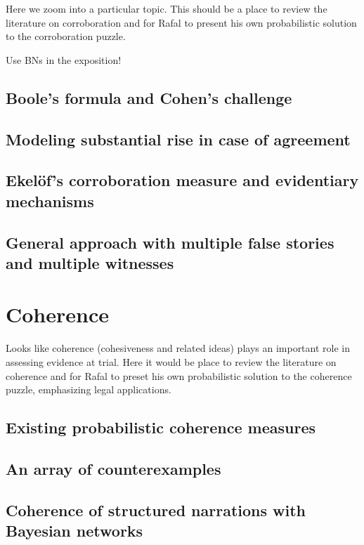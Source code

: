 \documentclass[]{book}
\begin{document}
Here we zoom into a particular topic. This should be a place to review
the literature on corroboration and for Rafal to present his own
probabilistic solution to the corroboration puzzle.

Use BNs in the exposition!

\section{Boole's formula and Cohen's challenge}

\section{Modeling substantial rise in case of agreement}

\section{Ekel\"of's corroboration measure and evidentiary mechanisms}

\section{General approach  with multiple false stories and multiple witnesses}

\chapter{Coherence}

Looks like coherence (cohesiveness and related ideas) plays an important
role in assessing evidence at trial. Here it would be place to review
the literature on coherence and for Rafal to preset his own
probabilistic solution to the coherence puzzle, emphasizing legal
applications.

\section{Existing probabilistic coherence measures}

\section{An array of counterexamples}

\section{Coherence of structured narrations 
with Bayesian networks}
\end{document}
